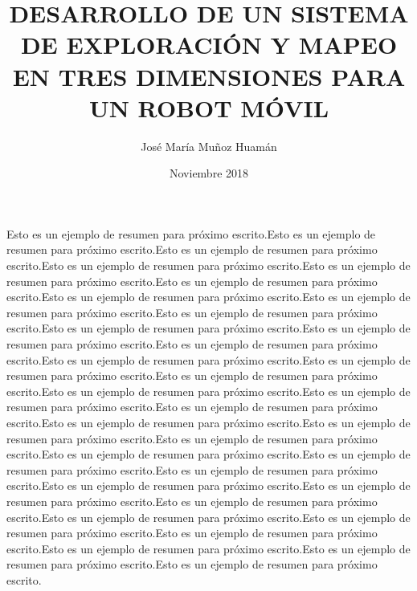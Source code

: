 \documentclass[a4paper, 12pt, oneside]{JMtesis}
\begin{document}
\frontmatter
{}
\title {DESARROLLO DE UN SISTEMA DE EXPLORACIÓN Y MAPEO EN TRES DIMENSIONES PARA UN ROBOT MÓVIL}
\author{Jos\'e Mar\'ia Muñoz Huam\'an}
\date{Noviembre 2018}

\maketitle
{}

%
%
%

\tableofcontents
\resumen

Esto es un ejemplo de resumen para próximo escrito.Esto es un ejemplo de resumen para próximo 
escrito.Esto es un ejemplo de resumen para próximo escrito.Esto es un ejemplo de resumen para próximo 
escrito.Esto es un ejemplo de resumen para próximo escrito.Esto es un ejemplo de resumen para próximo 
escrito.Esto es un ejemplo de resumen para próximo escrito.Esto es un ejemplo de resumen para próximo 
escrito.Esto es un ejemplo de resumen para próximo escrito.Esto es un ejemplo de resumen para próximo 
escrito.Esto es un ejemplo de resumen para próximo escrito.Esto es un ejemplo de resumen para próximo 
escrito.Esto es un ejemplo de resumen para próximo escrito.Esto es un ejemplo de resumen para próximo 
escrito.Esto es un ejemplo de resumen para próximo escrito.Esto es un ejemplo de resumen para próximo 
escrito.Esto es un ejemplo de resumen para próximo escrito.Esto es un ejemplo de resumen para próximo 
escrito.Esto es un ejemplo de resumen para próximo escrito.Esto es un ejemplo de resumen para próximo 
escrito.Esto es un ejemplo de resumen para próximo escrito.Esto es un ejemplo de resumen para próximo 
escrito.Esto es un ejemplo de resumen para próximo escrito.Esto es un ejemplo de resumen para próximo 
escrito.Esto es un ejemplo de resumen para próximo escrito.Esto es un ejemplo de resumen para próximo 
escrito.Esto es un ejemplo de resumen para próximo escrito.Esto es un ejemplo de resumen para próximo 
escrito.Esto es un ejemplo de resumen para próximo escrito.Esto es un ejemplo de resumen para próximo 
escrito.Esto es un ejemplo de resumen para próximo escrito.Esto es un ejemplo de resumen para próximo 
escrito.Esto es un ejemplo de resumen para próximo escrito.
\end{document}
